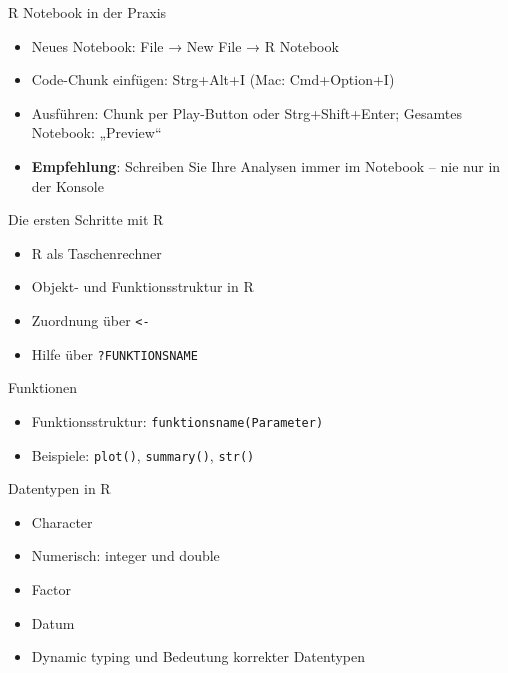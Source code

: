 \documentclass[
  ignorenonframetext,
]{beamer}
\providecommand{\tightlist}{%
  \setlength{\itemsep}{0pt}\setlength{\parskip}{0pt}}
\begin{document}
\begin{frame}{R Notebook in der Praxis}
\protect{}\label{r-notebook-in-der-praxis}
\begin{itemize}
\tightlist
\item
  Neues Notebook: File → New File → R Notebook
\item
  Code-Chunk einfügen: Strg+Alt+I (Mac: Cmd+Option+I)
\item
  Ausführen: Chunk per Play-Button oder Strg+Shift+Enter; Gesamtes
  Notebook: „Preview``
\item
  \textbf{Empfehlung}: Schreiben Sie Ihre Analysen immer im Notebook --
  nie nur in der Konsole
\end{itemize}
\end{frame}

\begin{frame}[fragile]{Die ersten Schritte mit R}
\protect{}\label{die-ersten-schritte-mit-r}
\begin{itemize}
\tightlist
\item
  R als Taschenrechner
\item
  Objekt- und Funktionsstruktur in R
\item
  Zuordnung über \texttt{\textless{}-}
\item
  Hilfe über \texttt{?FUNKTIONSNAME}
\end{itemize}
\end{frame}

\begin{frame}[fragile]{Funktionen}
\protect{}\label{funktionen}
\begin{itemize}
\tightlist
\item
  Funktionsstruktur: \texttt{funktionsname(Parameter)}
\item
  Beispiele: \texttt{plot()}, \texttt{summary()}, \texttt{str()}
\end{itemize}
\end{frame}

\begin{frame}{Datentypen in R}
\protect{}\label{datentypen-in-r}
\begin{itemize}
\tightlist
\item
  Character
\item
  Numerisch: integer und double
\item
  Factor
\item
  Datum
\item
  Dynamic typing und Bedeutung korrekter Datentypen
\end{itemize}
\end{frame}
\end{document}
